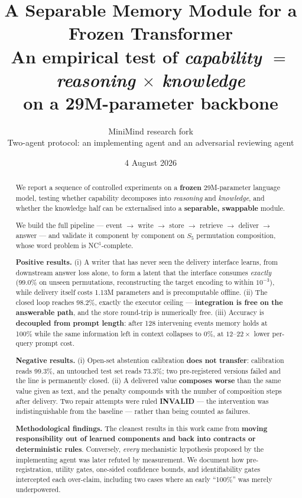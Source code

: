 \documentclass[11pt, a4paper]{article}
\title{\textbf{A Separable Memory Module for a Frozen Transformer}\\[5pt]
\large An empirical test of \emph{capability $=$ reasoning $\times$ knowledge}\\
on a 29M-parameter backbone}
\author{MiniMind research fork\\
\small Two-agent protocol: an implementing agent and an adversarial reviewing agent}
\date{4 August 2026}
\newcommand{\INVALID}{\textcolor{orange!80!black}{\textbf{INVALID}}}
\begin{document}
\maketitle

\begin{abstract}
\noindent
We report a sequence of controlled experiments on a \textbf{frozen} 29M-parameter
language model, testing whether capability decomposes into \emph{reasoning} and
\emph{knowledge}, and whether the knowledge half can be externalised into a
\textbf{separable, swappable} module.

We build the full pipeline --- event $\to$ write $\to$ store $\to$ retrieve $\to$
deliver $\to$ answer --- and validate it component by component on $S_5$ permutation
composition, whose word problem is NC$^1$-complete.

\textbf{Positive results.} (i) A writer that has never seen the delivery interface
learns, from downstream answer loss alone, to form a latent that the interface consumes
\emph{exactly} (99.0\% on unseen permutations, reconstructing the target encoding to
within $10^{-3}$), while delivery itself costs 1.13M parameters and is precomputable
offline. (ii) The closed loop reaches 98.2\%, exactly the executor ceiling ---
\textbf{integration is free on the answerable path}, and the store round-trip is
numerically free. (iii) Accuracy is \textbf{decoupled from prompt length}: after 128
intervening events memory holds at 100\% while the same information left in context
collapses to 0\%, at $12$--$22\times$ lower per-query prompt cost.

\textbf{Negative results.} (i) Open-set abstention calibration \textbf{does not
transfer}: calibration reads 99.3\%, an untouched test set reads 73.3\%; two
pre-registered versions failed and the line is permanently closed. (ii) A delivered
value \textbf{composes worse} than the same value given as text, and the penalty
compounds with the number of composition steps after delivery. Two repair attempts were
ruled \INVALID{} --- the intervention was indistinguishable from the baseline --- rather
than being counted as failures.

\textbf{Methodological findings.} The cleanest results in this work came from
\textbf{moving responsibility out of learned components and back into contracts or
deterministic rules}. Conversely, \emph{every} mechanistic hypothesis proposed by the
implementing agent was later refuted by measurement. We document how pre-registration,
utility gates, one-sided confidence bounds, and identifiability gates intercepted each
over-claim, including two cases where an early ``100\%'' was merely underpowered.
\end{abstract}
\end{document}

